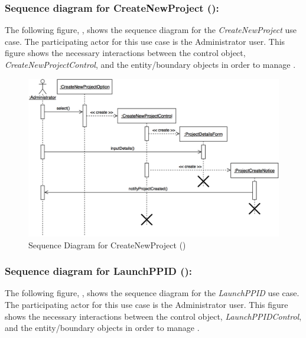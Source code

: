 \documentclass[12pt,letterpaper]{article}
\begin{document}
\subsubsection*{Sequence diagram for CreateNewProject ():}

The following figure, , shows the sequence diagram for the {\it CreateNewProject} use case. The participating actor for this use case is
the Administrator user. This figure shows the necessary interactions between the control object, {\it CreateNewProjectControl}, and the
entity/boundary objects in order to manage .

\begin{figure}[H]
	\centering{}
	\includegraphics[scale=0.24]{imgs/seq/create-new-project.png}
	\caption[ - Sequence Diagram for CreateNewProject]{Sequence Diagram for CreateNewProject ()}
\end{figure}

\subsubsection*{Sequence diagram for LaunchPPID ():}

The following figure, , shows the sequence diagram for the {\it LaunchPPID} use case. The participating actor for this use case is
the Administrator user. This figure shows the necessary interactions between the control object, {\it LaunchPPIDControl}, and the
entity/boundary objects in order to manage .
\end{document}
